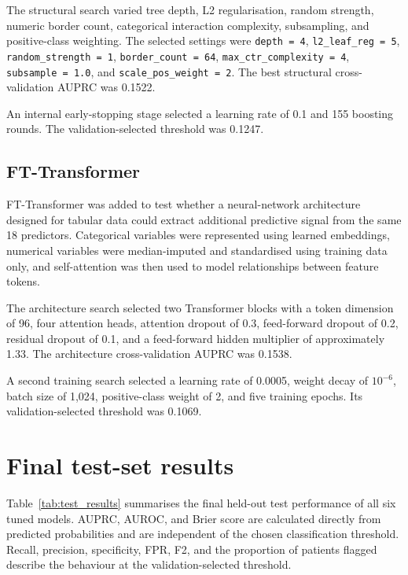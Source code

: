 \documentclass[11pt,a4paper]{article}
\begin{document}
The structural search varied tree depth, L2 regularisation, random strength, numeric border count, categorical interaction complexity, subsampling, and positive-class weighting. The selected settings were \texttt{depth = 4}, \texttt{l2\_leaf\_reg = 5}, \texttt{random\_strength = 1}, \texttt{border\_count = 64}, \texttt{max\_ctr\_complexity = 4}, \texttt{subsample = 1.0}, and \texttt{scale\_pos\_weight = 2}. The best structural cross-validation AUPRC was 0.1522.

An internal early-stopping stage selected a learning rate of 0.1 and 155 boosting rounds. The validation-selected threshold was 0.1247.

\subsection{FT-Transformer}

FT-Transformer was added to test whether a neural-network architecture designed for tabular data could extract additional predictive signal from the same 18 predictors. Categorical variables were represented using learned embeddings, numerical variables were median-imputed and standardised using training data only, and self-attention was then used to model relationships between feature tokens.

The architecture search selected two Transformer blocks with a token dimension of 96, four attention heads, attention dropout of 0.3, feed-forward dropout of 0.2, residual dropout of 0.1, and a feed-forward hidden multiplier of approximately 1.33. The architecture cross-validation AUPRC was 0.1538.

A second training search selected a learning rate of 0.0005, weight decay of $10^{-6}$, batch size of 1,024, positive-class weight of 2, and five training epochs. Its validation-selected threshold was 0.1069.

\section{Final test-set results}

Table~\ref{tab:test_results} summarises the final held-out test performance of all six tuned models. AUPRC, AUROC, and Brier score are calculated directly from predicted probabilities and are independent of the chosen classification threshold. Recall, precision, specificity, FPR, F2, and the proportion of patients flagged describe the behaviour at the validation-selected threshold.
\end{document}

